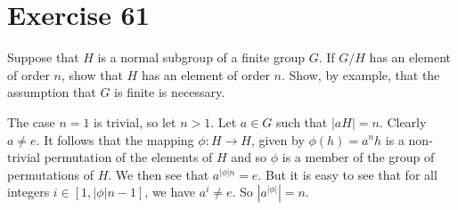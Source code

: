 \documentclass[12pt]{article}
\begin{document}
\section*{Exercise 61}

Suppose that $H$ is a normal subgroup of a finite group $G$.
If $G/H$ has an element of order $n$, show that $H$ has an element of order $n$.
Show, by example, that the assumption that $G$ is finite is necessary.

The case $n=1$ is trivial, so let $n>1$.  Let $a\in G$ such that $|aH|=n$.  Clearly $a\neq e$.
It follows that the mapping $\phi:H\to H$, given by $\phi(h)=a^nh$ is a non-trivial permutation of
the elements of $H$ and so $\phi$ is a member of the group of permutations of $H$.
We then see that $a^{|\phi|n}=e$.  But it is easy to see that for all
integers $i\in [1,|\phi|n-1]$, we have $a^i\neq e$.  So $|a^{|\phi|}|=n$.
\end{document}
